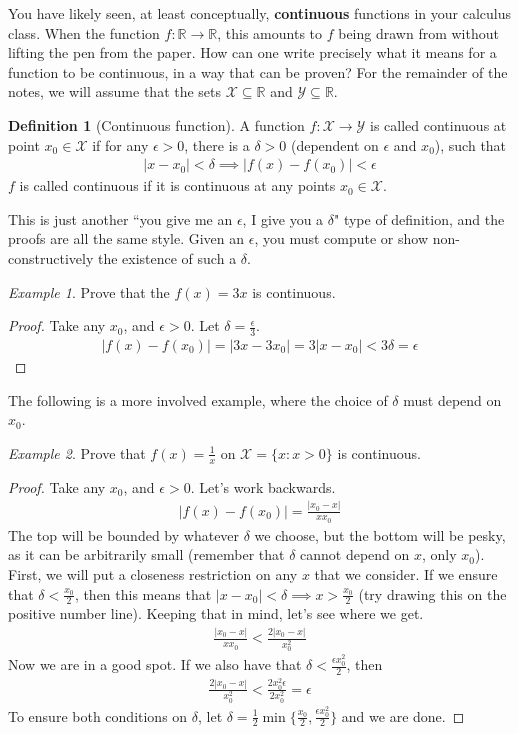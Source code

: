 \documentclass[11pt]{article}
\newcommand{\R}{\ensuremath{\mathbb R}}
\newcommand{\X}{\ensuremath{\mathcal X}}
\newcommand{\Y}{\ensuremath{\mathcal Y}}
\newcommand{\e}{\epsilon}
\newcommand{\sse}{\subseteq}
\theoremstyle{plain}
\theoremstyle{definition}
\newtheorem{defi}{Definition}[section]
\theoremstyle{remark}
\newtheorem{exm}{Example}[section]
\begin{document}
You have likely seen, at least conceptually, {\bf continuous} functions in your calculus class. When the function $f: \R \rightarrow \R$, this amounts to $f$ being drawn from without lifting the pen from the paper. How can one write precisely what it means for a function to be continuous, in a way that can be proven? For the remainder of the notes, we will assume that the sets $\X \sse \R$ and $\Y \sse \R$.
\begin{defi}[Continuous function]
    A function $f: \X \rightarrow \Y$ is called continuous at point $x_0 \in \X$ if for any $\e > 0$, there is a $\delta > 0$ (dependent on $\e$ and $x_0$), such that
    \begin{align*}
        |x - x_0| < \delta \implies |f(x) - f(x_0)| < \e
    \end{align*}
    $f$ is called continuous if it is continuous at any points $x_0 \in \X$.
\end{defi}
This is just another ``you give me an $\e$, I give you a $\delta$" type of definition, and the proofs are all the same style. Given an $\e$, you must compute or show non-constructively the existence of such a $\delta$.
\begin{exm}
    Prove that the $f(x) = 3x$ is continuous.
\end{exm}
\begin{proof}
    Take any $x_0$, and $\e > 0$. Let $\delta = \frac{\e}{3}$.
    \begin{align*}
        |f(x) - f(x_0)| = |3x - 3x_0| = 3|x - x_0| < 3\delta = \e
    \end{align*}
\end{proof}
The following is a more involved example, where the choice of $\delta$ must depend on $x_0$.
\begin{exm}
    Prove that $f(x) = \frac{1}{x}$ on $\X = \{x : x > 0\}$ is continuous.
\end{exm}
\begin{proof}
    Take any $x_0$, and $\e > 0$. Let's work backwards.
    \begin{align*}
        |f(x) - f(x_0)| = \frac{|x_0 - x|}{x x_0} 
    \end{align*}
    The top will be bounded by whatever $\delta$ we choose, but the bottom will be pesky, as it can be arbitrarily small (remember that $\delta$ cannot depend on $x$, only $x_0$). First, we will put a closeness restriction on any $x$ that we consider. If we ensure that $\delta < \frac{x_0}{2}$, then this means that $|x - x_0| < \delta \implies x > \frac{x_0}{2}$ (try drawing this on the positive number line). Keeping that in mind, let's see where we get.
    \begin{align*}
        \frac{|x_0 - x|}{x x_0} < \frac{2|x_0 - x|}{x_0^2}
    \end{align*}
    Now we are in a good spot. If we also have that $\delta < \frac{\e x_0^2}{2}$, then
    \begin{align*}
        \frac{2|x_0 - x|}{x_0^2} < \frac{2 x_0^2 \e}{2 x_0^2} = \e
    \end{align*}
    To ensure both conditions on $\delta$, let $\delta = \frac{1}{2} \min\{\frac{x_0}{2}, \frac{\e x_0^2}{2}\}$ and we are done.
\end{proof}
\end{document}
